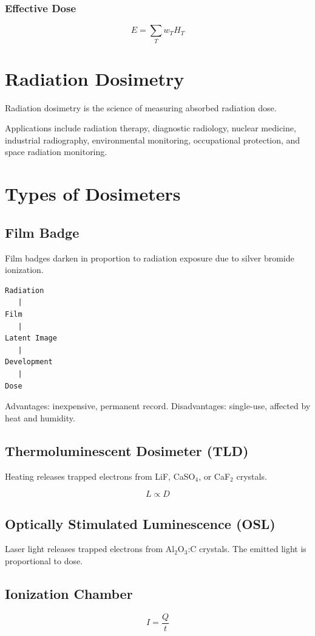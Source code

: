\documentclass[12pt]{article}
\begin{document}
\subsubsection{Effective Dose}
\begin{equation}
E=\sum_T w_T H_T
\end{equation}

\section{Radiation Dosimetry}
Radiation dosimetry is the science of measuring absorbed radiation dose.

Applications include radiation therapy, diagnostic radiology, nuclear medicine, industrial radiography, environmental monitoring, occupational protection, and space radiation monitoring.

\section{Types of Dosimeters}

\subsection{Film Badge}
Film badges darken in proportion to radiation exposure due to silver bromide ionization.

\begin{verbatim}
Radiation
   |
Film
   |
Latent Image
   |
Development
   |
Dose
\end{verbatim}

Advantages: inexpensive, permanent record.
Disadvantages: single-use, affected by heat and humidity.

\subsection{Thermoluminescent Dosimeter (TLD)}
Heating releases trapped electrons from LiF, CaSO$_4$, or CaF$_2$ crystals.

\[
L\propto D
\]

\subsection{Optically Stimulated Luminescence (OSL)}
Laser light releases trapped electrons from Al$_2$O$_3$:C crystals. The emitted light is proportional to dose.

\subsection{Ionization Chamber}
\begin{equation}
I=\frac{Q}{t}
\end{equation}
\end{document}
